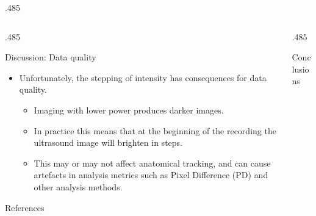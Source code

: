 \documentclass[final,hyperref={pdfpagelabels=false}]{beamer}
\begin{document}
\begin{frame}{}
\begin{columns}[t]
\begin{column}{.485\linewidth}
    \end{column}
  \end{columns}

  \vspace{1cm}

  \begin{columns}[t]
    \begin{column}{.485\linewidth}
          
      \begin{block}{Discussion: Data quality}
        \begin{itemize}
          \item Unfortunately, the stepping of intensity has consequences for
          data quality. 
          \begin{itemize}
            \item Imaging with lower power produces darker images. 
            \item In practice this means that at the beginning of the recording
            the ultrasound image will brighten in steps. 
            \item This may or may not affect anatomical tracking, and can cause
            artefacts in analysis metrics such as Pixel Difference (PD)
            \citep{Palo-MeasuringPrespeechArticulation-2019} and other analysis
            methods.
          \end{itemize}
        \end{itemize}
      \end{block}

      \begin{block}{References}

        
        

      \end{block}
    \end{column}
    \begin{column}{.485\linewidth}

      \begin{block}{Conclusions}


\end{block}
\end{column}
\end{columns}
\end{frame}
\end{document}

